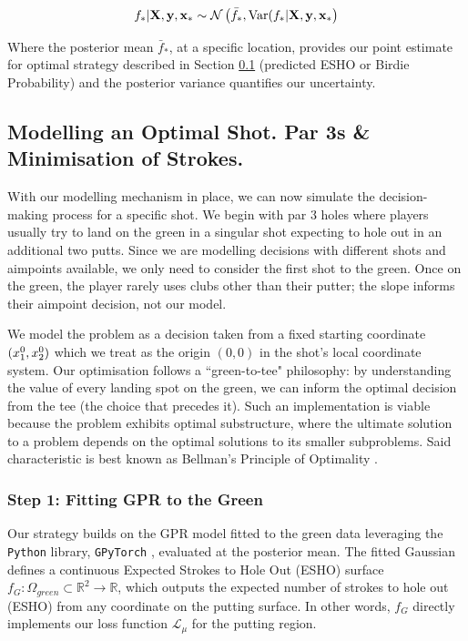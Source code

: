\documentclass[11pt, letterpaper]{article}
\begin{document}
\[f_* |\mathbf{X}, \mathbf{y}, \mathbf{x}_* \sim \mathcal{N}\left(\bar f_*, \text{Var}(f_* | \mathbf{X}, \mathbf{y}, \mathbf{x}_*\right)\]

Where the posterior mean $\bar f_*$, at a specific location, provides our point estimate for optimal strategy described in Section \ref{subsec:par3} (predicted ESHO or Birdie Probability) and the posterior variance quantifies our uncertainty.

\subsection{Modelling an Optimal Shot. Par 3s \& Minimisation of Strokes.}

\label{subsec:par3}

With our modelling mechanism in place, we can now simulate the decision-making process for a specific shot. We begin with par 3
holes where players usually try to land on the green in a singular shot expecting to hole out in an additional two putts. Since we are modelling decisions with different shots and aimpoints available, we only need to consider the first shot to the green. Once on the green, the player rarely uses clubs other than their putter; the slope informs their aimpoint decision, not our model. 

We model the problem as a decision taken from a fixed starting coordinate $(x_1^0,x_2^0)$ which we treat as the origin $(0,0)$ in the shot's local coordinate system. Our optimisation follows a ``green-to-tee" philosophy: by understanding the value of every landing spot on the green, we can inform the optimal decision from the tee (the choice that precedes it). Such an implementation is viable because the problem exhibits optimal substructure, where the ultimate solution to a problem depends on the optimal solutions to its smaller subproblems. Said characteristic is best known as Bellman's Principle of Optimality \parencite{rosu_bellman}.

\subsubsection{Step 1: Fitting GPR to the Green}
Our strategy builds on the GPR model fitted to the green data leveraging the \texttt{Python} library, \texttt{GPyTorch} \parencite{gardner2021gpytorch}, evaluated at the posterior mean. The fitted Gaussian defines a continuous Expected Strokes to Hole Out (ESHO) surface $f_G: \Omega_{green} \subset \mathbb{R}^2 \to \mathbb{R}$, which outputs the expected number of strokes to hole out (ESHO) from any coordinate on the putting surface. In other words, $f_G$ directly implements our loss function $\mathcal{L}_\mu$ for the putting region.
\end{document}
